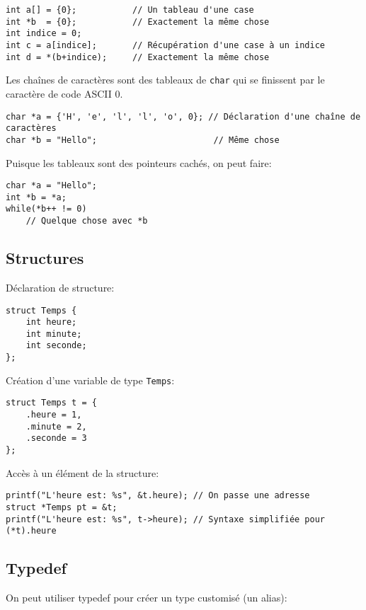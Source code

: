 \documentclass[10pt,a4paper,french]{article}
\begin{document}
\begin{verbatim}
int a[] = {0};           // Un tableau d'une case
int *b  = {0};           // Exactement la même chose
int indice = 0;
int c = a[indice];       // Récupération d'une case à un indice
int d = *(b+indice);     // Exactement la même chose
\end{verbatim}

Les chaînes de caractères sont des tableaux de {\tt char} qui se finissent par le caractère de code ASCII 0.

\begin{verbatim}
char *a = {'H', 'e', 'l', 'l', 'o', 0}; // Déclaration d'une chaîne de caractères
char *b = "Hello";                       // Même chose
\end{verbatim}

Puisque les tableaux sont des pointeurs cachés, on peut faire:

\begin{verbatim}
char *a = "Hello";
int *b = *a;
while(*b++ != 0)
    // Quelque chose avec *b
\end{verbatim}

\subsection{Structures}

Déclaration de structure:

\begin{verbatim}
struct Temps {
    int heure;
    int minute;
    int seconde;
};
\end{verbatim}

Création d'une variable de type {\tt Temps}:

\begin{verbatim}
struct Temps t = {
    .heure = 1,
    .minute = 2,
    .seconde = 3
};
\end{verbatim}

Accès à un élément de la structure:

\begin{verbatim}
printf("L'heure est: %s", &t.heure); // On passe une adresse
struct *Temps pt = &t;
printf("L'heure est: %s", t->heure); // Syntaxe simplifiée pour (*t).heure
\end{verbatim}

\subsection{Typedef}

On peut utiliser typedef pour créer un type customisé (un alias):
\end{document}
